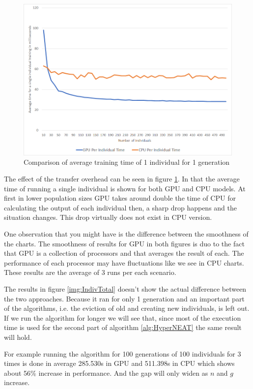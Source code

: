 \documentclass[twocolumn]{article}
\begin{document}
\begin{figure}
    \centering \includegraphics[width=\textwidth]{IndivSingle}
    \caption{Comparison of average training time of 1 individual for 1 generation}
    \label{img:IndivSingle}
\end{figure}

The effect of the transfer overhead can be seen in figure \ref{img:IndivSingle}. In that the average time of running a single individual is shown for both GPU and CPU models. At first in lower population sizes GPU takes around double the time of CPU for calculating the output of each individual then, a sharp drop happens and the situation changes. This drop virtually does not exist in CPU version.

One observation that you might have is the difference between the smoothness of the charts. The smoothness of results for GPU in both figures is duo to the fact that GPU is a collection of processors and that averages the result of each. The performance of each processor may have fluctuations like we see in CPU charts. These results are the average of 3 runs per each scenario.

The results in figure \ref{img:IndivTotal} doesn't show the actual difference between the two approaches. Because it ran for only 1 generation and an important part of the algorithms, i.e. the eviction of old and creating new individuals, is left out. If we run the algorithm for longer we will see that, since most of the execution time is used for the second part of algorithm \ref{alg:HyperNEAT} the same result will hold.

For example running the algorithm for 100 generations of 100 individuals for 3 times is done in average 285.530s in GPU and 511.398s in CPU which shows about 56\% increase in performance. And the gap will only widen as $n$ and $g$ increase.
\end{document}
